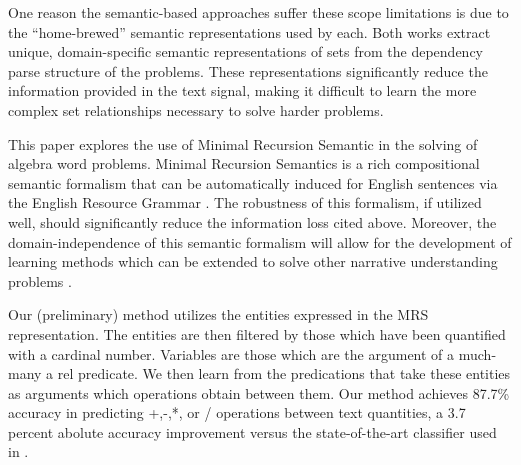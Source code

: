 One reason the semantic-based approaches suffer these scope limitations is due to the “home-brewed” semantic representations used by each. Both works extract unique, domain-specific semantic representations of sets from the dependency parse structure of the problems. These representations significantly reduce the information provided in the text signal, making it difficult to learn the more complex set relationships necessary to solve harder problems.

This paper explores the use of Minimal Recursion Semantic \cite{copestake2005minimal} in the solving of algebra word problems. 
Minimal Recursion Semantics is a rich compositional semantic formalism that can be automatically induced for English sentences via the English Resource Grammar \cite{flickinger2000building, flickinger2011accuracy}. 
The robustness of this formalism, if utilized well, should significantly reduce the information loss cited above.
Moreover, the domain-independence of this semantic formalism will allow for the development of learning methods which can be extended to solve other narrative understanding problems \cite{bender-EtAl:2015:IWCS2015}.

Our (preliminary) method utilizes the entities expressed in the MRS representation. 
The entities are then filtered by those which have been quantified with a cardinal number. 
Variables are those which are the argument of a much-many a rel predicate.
We then learn from the predications that take these entities as arguments which operations obtain between them. 
Our method achieves 87.7\% accuracy in predicting +,-,*, or / operations between text quantities, a 3.7 percent abolute accuracy improvement versus the state-of-the-art classifier used in \cite{koncel2015parsing}.

